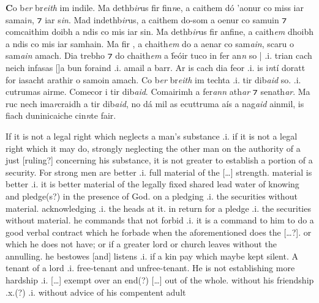 \documentclass[11pt]{article}
\begin{document}
\begin{pages}
\begin{Leftside}
    \pstart
    \textbf{C}o b\emph{er} br\emph{eith} im indile. Ma dethb\emph{ir}us fir fin\emph{n}e, a caithem d\'{o} 'aonur co miss iar samai\emph{n}, ⁊  iar s\emph{in}.  Mad indethb\emph{ir}us, a caithem do-som a oenur co samuin ⁊ comcaithim doibh a ndis co mis iar sin.  Ma dethb\emph{ir}us fir anfine, a caith\emph{em} dhoibh a ndis co mis iar samhain.  Ma  fir , a chaith\emph{em} do a aenar co sam\emph{ain}, scaru o sam\emph{ain} amach.  Dia trebho ⁊ do chaith\emph{em} a \.{f}e\'{o}ir tuco in fer an\emph{n} so | .i. trian cach neich infasas [\hspace{2mm}]a bun foraind .i. amail a barr.  Ar is cach dia feor .i. is i\emph{n}t\'{i} doratt for iasacht  arathir o samoin amach.  Co b\emph{er} br\emph{eith} im techta .i. tir dib\emph{aid} so.   .i. cutrumas airme.  Comecor i tir dib\emph{aid}.  Comairimh a fer\emph{ann} ath\emph{ar} ⁊ senath\emph{ar}.  Ma ruc nech ima\emph{r}craidh a tir dib\emph{aid}, no d\'{a} mil as ecuttruma a\'{i}s a nag\emph{aid} ainmil, is fiach duninicaiche cin\emph{n}te fair.
    \pend
  \endnumbering
  \end{Leftside}

\begin{Rightside}
    \beginnumbering
    \pstart
    If it is not a legal right which neglects a man's substance .i. if it is not a legal right which it may do, strongly neglecting the other man on the authority of a just [ruling?] concerning his substance, it is not greater to establish a portion of a security.  For strong men are better .i. full material of the [\ldots] strength. material is better .i. it is better material of the legally fixed shared lead water of knowing and pledge(s?) in the presence of God.  on a pledging .i. the securities without material. acknowledging .i. the heads at it.  in return for a pledge .i. the securities without material.  he commands that not forbid .i. it is a command to him to do a good verbal contract which he forbade when the aforementioned does the [\ldots?].  or which he does not have; or if a greater lord or church leaves without the annulling.  he bestowes [and] listens .i. if a kin pay which maybe kept silent.  A tenant of a lord .i. free-tenant and unfree-tenant. He is not establishing more hardship .i. [\ldots] exempt over an end(?) [\ldots] out of the whole.  without his friendship .x.(?) .i. without advice of his compentent adult 
    \pend
    

\end{Rightside}
\end{pages}
\end{document}

